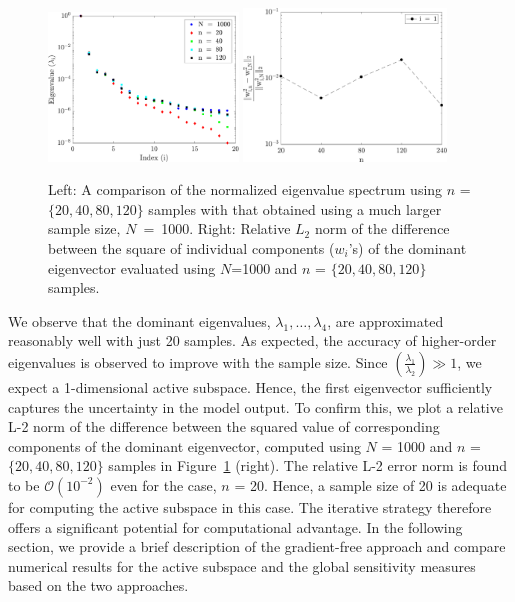 %
\begin{figure}[htbp]
 \begin{center}
  \includegraphics[width=0.45\textwidth]{./Figures/eig_comp}
   \includegraphics[width=0.48\textwidth]{./Figures/err_eigv_1}
\caption{Left: A comparison of the normalized eigenvalue spectrum using $n$ = $\{20,40,80,120\}$ samples with that
obtained using a much larger sample size, $N$~=~1000. Right: Relative $L_2$ 
norm of the difference between
the square of individual components ($w_i$'s) of the dominant eigenvector evaluated using $N$=1000 and $n$ = $\{20,40,80,120\}$ samples.} 
\label{fig:eig_comp}
\end{center}
\end{figure}
%
We observe that the dominant eigenvalues, $\lambda_1, \ldots, \lambda_4$, 
are approximated 
reasonably well with just 20 samples. As expected, the accuracy of higher-order eigenvalues is observed
to improve with the sample size. Since 
$\left(\frac{\lambda_1}{\lambda_2}\right)\gg 1$, we expect 
a 1-dimensional active subspace. Hence, the first eigenvector 
sufficiently captures the uncertainty in
the  model output. To confirm this, we plot a relative L-2 norm of the difference between the 
squared value of corresponding components of the dominant eigenvector, computed using $N$ = 1000
and $n$ = $\{20,40,80,120\}$ samples in Figure~\ref{fig:eig_comp} (right). 
The relative L-2 error norm is found to be $\mathcal{O}(10^{-2})$ even for the case, $n$ = 20.
Hence, a sample size of 20 is adequate for computing the active subspace in this
case. The iterative strategy therefore offers a significant potential for computational advantage. 
In the following section, we provide a brief description of the gradient-free approach and compare
numerical results for the active subspace and the global sensitivity measures based on the two
approaches. 

